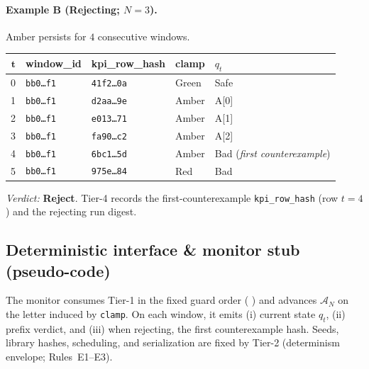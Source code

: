 \documentclass[10pt]{article}
\makeatletter
\newcommand{\JSGxref}[2]{%
  \@ifundefined{r@#2}{\textbf{[#1 ??]}}{#1~\ref{#2}}}
\newcommand{\secref}[1]{\JSGxref{§}{#1}}
\makeatother
\begin{document}
\paragraph{Example B (Rejecting; $N{=}3$).} \textsf{Amber} persists for $4$ consecutive windows.
\begin{center}
\renewcommand{\arraystretch}{1.10}
\begin{tabularx}{\textwidth}{@{} r l l l l @{}}
\toprule
$\bm{t}$ & \textbf{window\_id} & \textbf{kpi\_row\_hash} & \textbf{clamp} & \textbf{$q_t$} \\
\midrule
0 & \texttt{bb0…f1} & \texttt{41f2…0a} & Green & \textsf{Safe} \\
1 & \texttt{bb0…f1} & \texttt{d2aa…9e} & Amber & \textsf{A}[0] \\
2 & \texttt{bb0…f1} & \texttt{e013…71} & Amber & \textsf{A}[1] \\
3 & \texttt{bb0…f1} & \texttt{fa90…c2} & Amber & \textsf{A}[2] \\
\rowcolor{rulebg}
4 & \texttt{bb0…f1} & \texttt{6bc1…5d} & Amber & \textsf{Bad} \;\;(\emph{first counterexample}) \\
5 & \texttt{bb0…f1} & \texttt{975e…84} & Red   & \textsf{Bad} \\
\bottomrule
\end{tabularx}
\end{center}
\emph{Verdict:} \textbf{Reject}. Tier-4 records the first-counterexample \texttt{kpi\_row\_hash} (row $t{=}4$) and the rejecting run digest.

\subsection{Deterministic interface \& monitor stub (pseudo-code)}
The monitor consumes Tier-1 in the fixed guard order (\secref{sec:evidence}) and advances $\mathcal{A}_N$ on the letter induced by \texttt{clamp}. On each window, it emits (i) current state $q_t$, (ii) prefix verdict, and (iii) when rejecting, the first counterexample hash. Seeds, library hashes, scheduling, and serialization are fixed by Tier-2 (determinism envelope; Rules~E1–E3).
\end{document}

